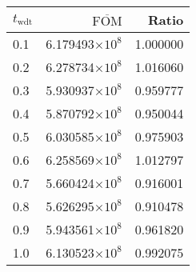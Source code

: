 \begin{tabular}{lrr}
\toprule
$t_{\mathrm{wdt}}$ & $\overline{\mathrm{FOM}}$ &    Ratio \\
\midrule
               0.1 &   6.179493$\times 10^{8}$ & 1.000000 \\
               0.2 &   6.278734$\times 10^{8}$ & 1.016060 \\
               0.3 &   5.930937$\times 10^{8}$ & 0.959777 \\
               0.4 &   5.870792$\times 10^{8}$ & 0.950044 \\
               0.5 &   6.030585$\times 10^{8}$ & 0.975903 \\
               0.6 &   6.258569$\times 10^{8}$ & 1.012797 \\
               0.7 &   5.660424$\times 10^{8}$ & 0.916001 \\
               0.8 &   5.626295$\times 10^{8}$ & 0.910478 \\
               0.9 &   5.943561$\times 10^{8}$ & 0.961820 \\
               1.0 &   6.130523$\times 10^{8}$ & 0.992075 \\
\bottomrule
\end{tabular}
